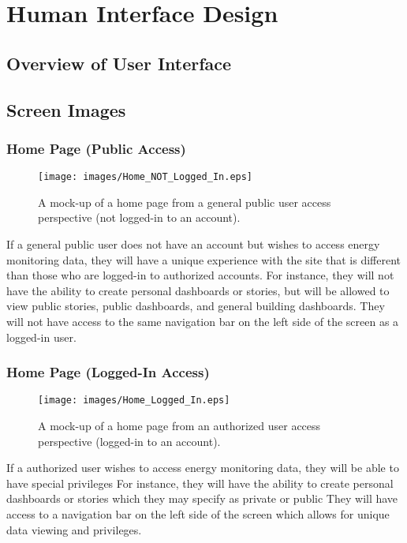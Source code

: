 \documentclass[journal,10pt,onecolumn,compsoc]{IEEEtran}
\begin{document}
	\section{Human Interface Design}
    \subsection{Overview of User Interface}
    \iffalse
    Describe the functionality of the system from the user’s perspective. Explain how the
    user will be able to use your system to complete all the expected features and the
    feedback information that will be displayed for the user.
    \fi
    \subsection{Screen Images}
    \iffalse
    Display screenshots showing the interface from the user’s perspective. These can be
    hand drawn or you can use an automated drawing tool. Just make them as accurate
    as possible. (Graph paper works well.) 
    \fi 
	
	\subsubsection{Home Page (Public Access)}
    \begin{figure}[H]
        \centering
        \texttt{[image: images/Home\_NOT\_Logged\_In.eps]}
        \caption{A mock-up of a home page from a general public user access perspective (not logged-in to an account).}
    \end{figure}
	If a general public user does not have an account but wishes to access energy monitoring data, they will
	have a unique experience with the site that is different than those who are logged-in to authorized accounts. 
	For instance, they will not have the ability to create personal dashboards or stories, but will be allowed to view
	public stories, public dashboards, and general building dashboards. They will not have access to the same navigation 
	bar on the left side of the screen as a logged-in user. 
	
	\subsubsection{Home Page (Logged-In Access)}
    \begin{figure}[H]
        \centering
        \texttt{[image: images/Home\_Logged\_In.eps]}
        \caption{A mock-up of a home page from an authorized user access perspective (logged-in to an account).}
    \end{figure}
	If a authorized user wishes to access energy monitoring data, they will be able to have special privileges 
	For instance, they will have the ability to create personal dashboards or stories which they may specify as private or public
	They will have access to a navigation bar on the left side of the screen which allows for unique data viewing and privileges. 
	
\end{document}
